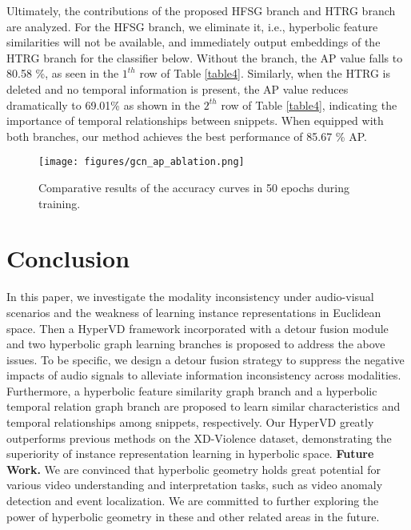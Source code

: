 \documentclass[sigconf]{acmart}
\begin{document}
Ultimately, the contributions of the proposed HFSG branch and HTRG branch are analyzed. For the HFSG branch, we eliminate it, i.e., hyperbolic feature similarities will not be available, and immediately output embeddings of the HTRG branch for the classifier below. Without the branch, the AP value falls to 80.58 \%, as seen in the $1^{th}$ row of Table \ref{table4}. Similarly, when the HTRG is deleted and no temporal information is present, the AP value reduces dramatically to 69.01\% as shown in the $2^{th}$ row of Table \ref{table4}, indicating the importance of temporal relationships between snippets. When equipped with both branches, our method achieves the best performance of 85.67 \% AP.





\begin{figure}[t]
    \centering
\texttt{[image: figures/gcn\_ap\_ablation.png]} \caption{Comparative results of the accuracy curves in 50 epochs during training.}
    \label{fig5}
\end{figure}

\section{Conclusion}
In this paper, we investigate the modality inconsistency under audio-visual scenarios and the weakness of learning instance representations in Euclidean space. Then a HyperVD framework incorporated with a detour fusion module and two hyperbolic graph learning branches is proposed to address the above issues. To be specific, we design a detour fusion strategy to suppress the negative impacts of audio signals to alleviate information inconsistency across modalities. Furthermore, a hyperbolic feature similarity graph branch and a hyperbolic temporal relation graph branch are proposed to learn similar characteristics and temporal relationships among snippets, respectively. Our HyperVD greatly outperforms previous methods on the XD-Violence dataset, demonstrating the superiority of instance representation learning in hyperbolic space.
\noindent\textbf{Future Work.} We are convinced that hyperbolic geometry holds great potential for various video understanding and interpretation tasks, such as video anomaly detection and event localization. We are committed to further exploring the power of hyperbolic geometry in these and other related areas in the future.






\newpage


\end{document}
